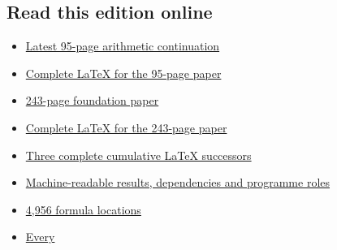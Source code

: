 \documentclass[
]{article}
\providecommand{\tightlist}{%
  \setlength{\itemsep}{0pt}\setlength{\parskip}{0pt}}
\begin{document}
\subsection{Read this edition online}\label{read-this-edition-online-1}

\begin{itemize}
\tightlist
\item
  \href{https://github.com/KokunoYumeto/zeta-function-research-reader/blob/main/workbenches/splitzero-tandem/continuations/20260919-arithmetic-signs-marked-classes/readers/95_PAGE_ARITHMETIC_CONTINUATION.pdf}{Latest
  95-page arithmetic continuation}
\item
  \href{https://github.com/KokunoYumeto/zeta-function-research-reader/blob/main/workbenches/splitzero-tandem/continuations/20260919-arithmetic-signs-marked-classes/arrival_02/assembly/ARRIVAL02_PROOF_READER.tex}{Complete
  LaTeX for the 95-page paper}
\item
  \href{https://github.com/KokunoYumeto/zeta-function-research-reader/blob/main/workbenches/splitzero-tandem/continuations/20260919-arithmetic-signs-marked-classes/readers/243_PAGE_FOUNDATION.pdf}{243-page
  foundation paper}
\item
  \href{https://github.com/KokunoYumeto/zeta-function-research-reader/blob/main/workbenches/splitzero-tandem/continuations/20260919-arithmetic-signs-marked-classes/first_intake/assembly/MULTI_INTAKE_PROOF_READER.tex}{Complete
  LaTeX for the 243-page paper}
\item
  \href{https://github.com/KokunoYumeto/zeta-function-research-reader/blob/main/workbenches/splitzero-tandem/continuations/20260919-arithmetic-signs-marked-classes/arrival_02/assembly/cumulative}{Three
  complete cumulative LaTeX successors}
\item
  \href{https://github.com/KokunoYumeto/zeta-function-research-reader/blob/main/workbenches/splitzero-tandem/continuations/20260919-arithmetic-signs-marked-classes/research_index/PROGRAM_INDEX.json}{Machine-readable
  results, dependencies and programme roles}
\item
  \href{https://github.com/KokunoYumeto/zeta-function-research-reader/blob/main/workbenches/splitzero-tandem/continuations/20260919-arithmetic-signs-marked-classes/research_index/FORMULA_LOCATORS.json}{4,956
  formula locations}
\item
  \href{https://github.com/KokunoYumeto/zeta-function-research-reader/blob/main/workbenches/splitzero-tandem/continuations/20260919-arithmetic-signs-marked-classes/PDF_LATEX_MAP.json}{Every
}
\end{itemize}
\end{document}
